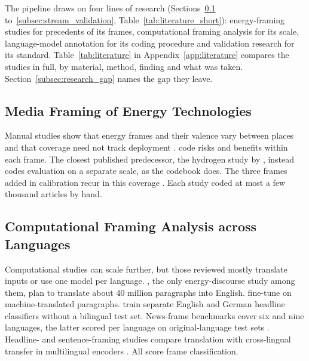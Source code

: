 The pipeline draws on four lines of research (Sections~\ref{subsec:stream_framing} to~\ref{subsec:stream_validation}, Table~\ref{tab:literature_short}): energy-framing studies for precedents of its frames, computational framing analysis for its scale, language-model annotation for its coding procedure and validation research for its standard. Table~\ref{tab:literature} in Appendix~\ref{app:literature} compares the studies in full, by material, method, finding and what was taken. Section~\ref{subsec:research_gap} names the gap they leave.



\subsection{Media Framing of Energy Technologies}\label{subsec:stream_framing}

Manual studies show that energy frames and their valence vary between places \parencites[p.~6]{rochyadireetz2019framing}[pp.~177, 179]{stephens2009windmedia} and that coverage need not track deployment \parencite[p.~179]{stephens2009windmedia}. \textcite[pp.~173--174]{stephens2009windmedia} code risks and benefits within each frame. The closest published predecessor, the hydrogen study by \textcite[p.~7]{ali2025hydrogenframing}, instead codes evaluation on a separate scale, as the codebook does. The three frames added in calibration recur in this coverage \parencites[pp.~6, 9]{ali2025hydrogenframing}[pp.~177--181]{stephens2009windmedia}. Each study coded at most a few thousand articles by hand.

\subsection{Computational Framing Analysis across Languages}\label{subsec:stream_computational}\label{subsec:stream_multilingual}

Computational studies can scale further, but those reviewed mostly translate inputs or use one model per language. \textcite{toetzke2022energydiscourse}, the only energy-discourse study among them, plan to translate about 40 million paragraphs into English. \textcite{jumle2024findingframes} fine-tune on machine-translated paragraphs. \textcite{guo2023openframing} train separate English and German headline classifiers without a bilingual test set. News-frame benchmarks cover six \parencite{piskorski2023multifaceted} and nine languages, the latter scored per language on original-language test sets \parencite{piskorski2023semeval}. Headline- and sentence-framing studies compare translation with cross-lingual transfer in multilingual encoders \parencite{akyurek2020multilingualframing,akter2024scalingframing}. All score frame classification.

